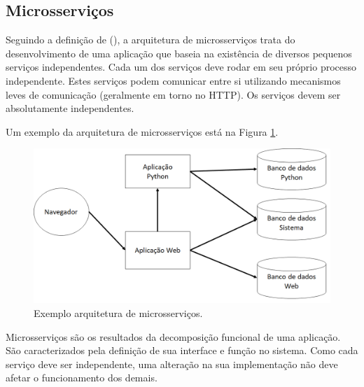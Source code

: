 \subsection{Microsserviços}
Seguindo a definição de \citeauthor{ms1} (\citeyear{ms1}), a arquitetura de microsserviços trata do desenvolvimento de uma aplicação que baseia na existência de diversos pequenos serviços independentes. Cada um dos serviços deve rodar em seu próprio processo independente. Estes serviços podem comunicar entre si utilizando mecanismos leves de comunicação (geralmente em torno no HTTP). Os serviços devem ser absolutamente independentes.

Um exemplo da arquitetura de microsserviços está na Figura \ref{fig:arquitetura-microsservicos}.

\begin{figure}[htbp]
	\centering
	\includegraphics[width=1\linewidth]{figuras/WebService/microservices.png}
	\caption{Exemplo arquitetura de microsserviços.}
	\label{fig:arquitetura-microsservicos}
\end{figure}

Microsserviços são os resultados da decomposição funcional de uma aplicação. São caracterizados pela definição de sua interface e função no sistema. Como cada serviço deve ser independente, uma alteração na sua implementação não deve afetar o funcionamento dos demais. \cite{Pahl}






